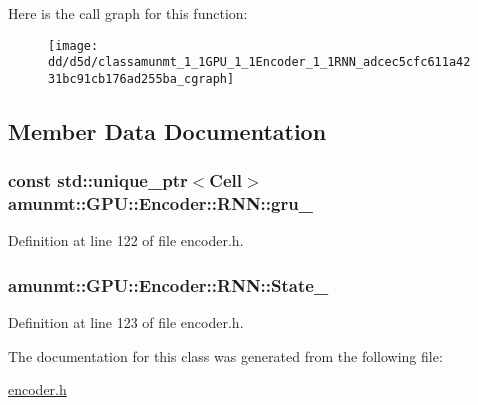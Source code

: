 Here is the call graph for this function\+:
\nopagebreak
\begin{figure}[H]
\begin{center}
\leavevmode
\texttt{[image: dd/d5d/classamunmt\_1\_1GPU\_1\_1Encoder\_1\_1RNN\_adcec5cfc611a4231bc91cb176ad255ba\_cgraph]}
\end{center}
\end{figure}




\subsection{Member Data Documentation}
\subsubsection[{\texorpdfstring{gru\+\_\+}{gru_}}]{\setlength{\rightskip}{0pt plus 5cm}const std\+::unique\+\_\+ptr$<${\bf Cell}$>$ amunmt\+::\+G\+P\+U\+::\+Encoder\+::\+R\+N\+N\+::gru\+\_\+\hspace{0.3cm}{\ttfamily [private]}}\hypertarget{classamunmt_1_1GPU_1_1Encoder_1_1RNN_acd6ef602484ab71138e4f49ab8b75c67}{}\label{classamunmt_1_1GPU_1_1Encoder_1_1RNN_acd6ef602484ab71138e4f49ab8b75c67}


Definition at line 122 of file encoder.\+h.

\subsubsection[{\texorpdfstring{State\+\_\+}{State_}}]{ amunmt\+::\+G\+P\+U\+::\+Encoder\+::\+R\+N\+N\+::\+State\+\_\+\hspace{0.3cm}{\ttfamily [private]}}\hypertarget{classamunmt_1_1GPU_1_1Encoder_1_1RNN_a2c27e8bf2554193cd582200e7e6fed12}{}\label{classamunmt_1_1GPU_1_1Encoder_1_1RNN_a2c27e8bf2554193cd582200e7e6fed12}


Definition at line 123 of file encoder.\+h.



The documentation for this class was generated from the following file\+:\begin{DoxyCompactItemize}
\item 
\hyperlink{encoder_8h}{encoder.\+h}\end{DoxyCompactItemize}
